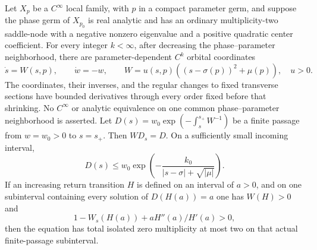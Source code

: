 \begin{lemma}\label{lem:saddle-node-passage}
Let $X_p$ be a $C^\infty$ local family, with $p$ in a compact
parameter germ, and suppose the phase germ of $X_{p_0}$ is real analytic
and has an ordinary multiplicity-two saddle-node with a negative nonzero
eigenvalue and a positive quadratic center coefficient.  For every
integer $k<\infty$, after decreasing the
phase--parameter neighborhood, there are parameter-dependent $C^k$
orbital coordinates
\[
 \dot s=W(s,p),\qquad \dot w=-w,\qquad
 W=u(s,p)((s-\sigma(p))^2+\mu(p)),\quad u>0.
\]
The coordinates, their inverses, and the regular changes to fixed
transverse sections have bounded derivatives through every order fixed
before that shrinking.  No $C^\infty$ or analytic equivalence on one
common phase--parameter neighborhood is asserted.
Let $D(s)=w_0\exp(-\int_s^{s_+}W^{-1})$ be a finite passage from
$w=w_0>0$ to $s=s_+$.  Then $WD_s=D$.  On a sufficiently small
incoming interval,
\begin{equation}\label{eq:simple-saddle-node-smallness}
 D(s)\le w_0\exp\left(-\frac{k_0}
                         {|s-\sigma|+\sqrt{|\mu|}}\right).
\end{equation}
If an increasing return transition $H$ is defined on an interval of
$a>0$, and on one subinterval containing every solution of $D(H(a))=a$
one has $W(H)>0$ and
\begin{equation}\label{eq:simple-pfaff-hypothesis}
 1-W_s(H(a))+aH''(a)/H'(a)>0,
\end{equation}
then the equation has total isolated zero multiplicity at most two
on that actual finite-passage subinterval.
\end{lemma}

